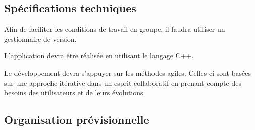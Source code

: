 \documentclass{report}
\begin{document}
\subsection{Spécifications techniques}

\hspace{0.5cm}Afin de faciliter les conditions de travail en groupe, il faudra utiliser un gestionnaire de version.\par
L'application devra être réalisée en utilisant le langage C++.\par
Le développement devra s'appuyer sur les méthodes agiles. Celles-ci sont basées sur une approche itérative dans un esprit collaboratif en prenant compte des besoins des utilisateurs et de leurs évolutions.\par

\subsection{Organisation prévisionnelle}
\end{document}

